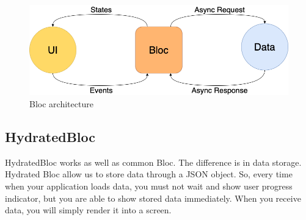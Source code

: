 \begin{figure}
    \centering
    \includegraphics[scale=0.4]{assets/bloc_architecture.png}
    \caption{Bloc architecture\cite{bloc}}
    \label{fig:bloc-architecture}
\end{figure}

\subsection{HydratedBloc}\label{subsec:hydratedbloc}
HydratedBloc works as well as common Bloc.
The difference is in data storage.
Hydrated Bloc allow us to store data through a JSON object.
So, every time when your application loads data, you must not wait and show user progress indicator, but you are able to show stored data immediately.
When you receive data, you will simply render it into a screen.